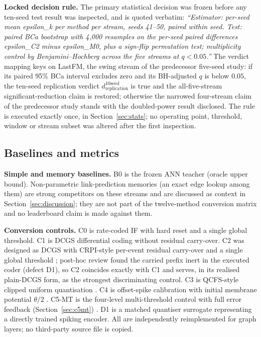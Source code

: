 \documentclass[preprint,12pt]{elsarticle}
\begin{document}
\textbf{Locked decision rule.} The primary statistical decision was frozen before any ten-seed test result was inspected, and is quoted verbatim: \emph{``Estimator: per-seed mean epsilon\_k per method per stream, seeds 41--50, paired within seed. Test: paired BCa bootstrap \cite{efron1987} with 4{,}000 resamples on the per-seed paired differences epsilon\_C2 minus epsilon\_M0, plus a sign-flip permutation test; multiplicity control by Benjamini--Hochberg \cite{benjamini1995} across the five streams at $q<0.05$.''} The verdict mapping keys on LastFM, the swing stream of the predecessor five-seed study: if its paired 95\% BCa interval excludes zero and its BH-adjusted $q$ is below $0.05$, the ten-seed replication verdict $d_{\mathrm{replication}}^{10\mathrm{seed}}$ is true and the all-five-stream significant-reduction claim is restored; otherwise the narrowed four-stream claim of the predecessor study stands with the doubled-power result disclosed. The rule is executed exactly once, in Section~\ref{sec:stats}; no operating point, threshold, window or stream subset was altered after the first inspection.

\subsection{Baselines and metrics}
\label{sec:baselines}

\textbf{Simple and memory baselines.} B0 is the frozen ANN teacher (oracle upper bound). Non-parametric link-prediction memories (an exact edge lookup among them) are strong competitors on these streams and are discussed as context in Section~\ref{sec:discussion}; they are not part of the twelve-method conversion matrix and no leaderboard claim is made against them.

\textbf{Conversion controls.} C0 is rate-coded IF with hard reset and a single global threshold. C1 is DCGS differential coding without residual carry-over. C2 was designed as DCGS with CRPI-style per-event residual carry-over and a single global threshold \cite{xu2026crpi}; post-hoc review found the carried prefix inert in the executed coder (defect D1), so C2 coincides exactly with C1 and serves, in its realised plain-DCGS form, as the strongest discriminating control. C3 is QCFS-style clipped uniform quantisation \cite{bu2022qcfs}. C4 is offset-spike calibration with initial membrane potential $\theta/2$ \cite{cos2023offset}. C5-MT is the four-level multi-threshold control with full error feedback (Section~\ref{sec:c5mt}) \cite{fang2026mpef}. D1 is a matched quantiser surrogate representing a directly trained spiking encoder. All are independently reimplemented for graph layers; no third-party source file is copied.
\end{document}
